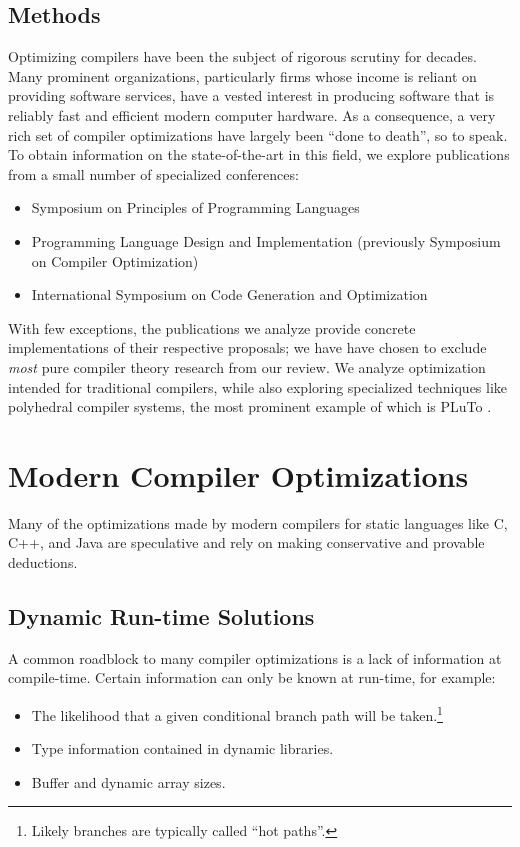 \documentclass[nobib]{tufte-handout}
\begin{document}
\subsection{Methods}
Optimizing compilers have been the subject of rigorous scrutiny for decades.  Many prominent organizations, particularly firms whose income is reliant on providing software services, have a vested interest in producing software that is reliably fast and efficient modern computer hardware.  As a consequence, a very rich set of compiler optimizations have largely been ``done to death'', so to speak.  To obtain information on the state-of-the-art in this field, we explore publications from a small number of specialized conferences: 
\begin{itemize}
\item Symposium on Principles of Programming Languages
\item Programming Language Design and Implementation (previously Symposium on Compiler Optimization)
\item International Symposium on Code Generation and Optimization
\end{itemize}

With few exceptions, the publications we analyze provide concrete implementations of their respective proposals; we have have chosen to exclude \emph{most} pure compiler theory research from our review.  We analyze optimization intended for traditional compilers, while also exploring specialized techniques like polyhedral compiler systems, the most prominent example of which is PLuTo \cite{Pluto}.  


\section{Modern Compiler Optimizations}
Many of the optimizations made by modern compilers for static languages like C, C++, and Java are speculative and rely on making conservative and provable deductions.  


\subsection{Dynamic Run-time Solutions}
A common roadblock to many compiler optimizations is a lack of information at compile-time.  Certain information can only be known at run-time, for example: 
\begin{itemize}
\item The likelihood that a given conditional branch path will be taken.\footnote{Likely branches are typically called ``hot paths''.}
\item Type information contained in dynamic libraries.
\item Buffer and dynamic array sizes.
\end{itemize}
\end{document}
